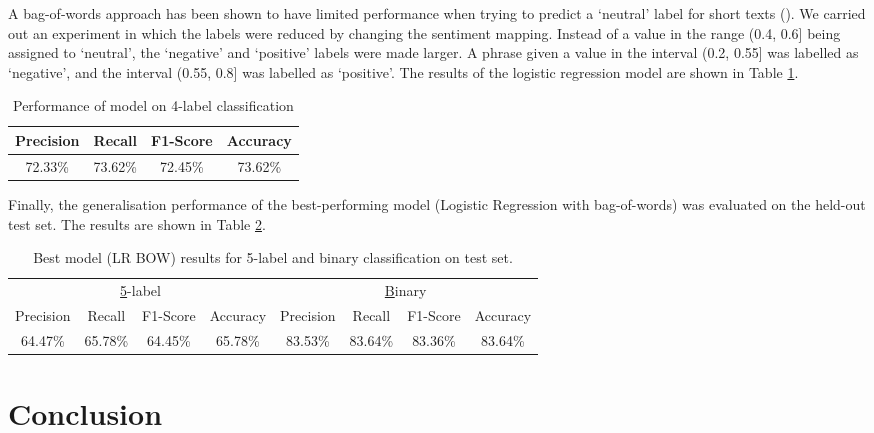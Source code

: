 \documentclass{article}
\begin{document}
A bag-of-words approach has been shown to have limited performance when trying to predict a `neutral' label for short texts (\cite{wang2012system}). We carried out an experiment in which the labels were reduced by changing the sentiment mapping. Instead of a value in the range (0.4, 0.6] being assigned to `neutral', the `negative' and `positive' labels were made larger. A phrase given a value in the interval (0.2, 0.55] was labelled as `negative', and the interval (0.55, 0.8] was labelled as `positive'. The results of the logistic regression model are shown in Table \ref{tab:4label}.

\begin{table}[H]
\centering
\begin{tabular}{|cccc|}
\hline
Precision & Recall  & F1-Score & Accuracy \\ \hline
72.33\%   & 73.62\% & 72.45\%  & 73.62\%  \\ \hline
\end{tabular}
\caption{Performance of model on 4-label classification}
\label{tab:4label}
\end{table}

Finally, the generalisation performance of the best-performing model (Logistic Regression with bag-of-words) was evaluated on the held-out test set. The results are shown in Table \ref{tab:final-results}.

\begin{table}[H]
\centering
\begin{tabular}{|cccc|cccc|}
\hline
\multicolumn{4}{|c|}{{\ul 5-label}}       & \multicolumn{4}{c|}{{\ul Binary}}         \\
Precision & Recall  & F1-Score & Accuracy & Precision & Recall  & F1-Score & Accuracy \\ \hline
64.47\%   & 65.78\% & 64.45\%  & 65.78\%  & 83.53\%   & 83.64\% & 83.36\%  & 83.64\%  \\ \hline
\end{tabular}
\caption{Best model (LR BOW) results for 5-label and binary classification on test set.}
\label{tab:final-results}
\end{table}





\section{Conclusion}
    
\end{document}

